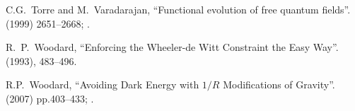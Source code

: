 \begin{thebibliography}{99}
C.G.~Torre and M.~Varadarajan,
``Functional evolution of free quantum fields''.
  (1999) 2651--2668; .\newline
{\tt{}}

R.~P.~Woodard,
``Enforcing the Wheeler-de Witt Constraint the Easy Way''.
  (1993), 483--496.\\
{\tt{}}

 R.P.~Woodard,
  ``Avoiding Dark Energy with $1/R$ Modifications of Gravity''.
    (2007) pp.403--433; .\\
{\tt{}}


\end{thebibliography}
